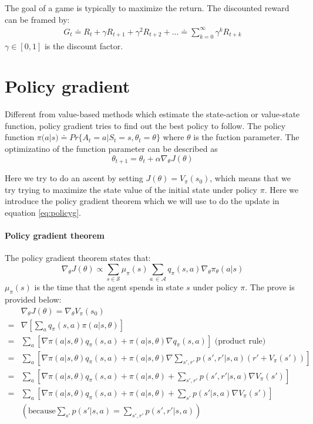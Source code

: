 \documentclass{article}
\begin{document}
\begin{multicols*}{2}
		The goal of a game is typically to maximize the return. The discounted reward can be framed by:
		\begin{align*}
			 G_t \doteq R_{t} + \gamma R_{t+1} + \gamma^{2}R_{t+2} + ... \doteq  \sum_{k=0}^{\infty} \gamma^{k}R_{t+k} 
		\end{align*}
		$ \gamma \in [0, 1] $ is the discount factor.
		
		\section*{Policy gradient}
			 Different from value-based methods which estimate the state-action or value-state function, policy gradient tries to find out the best policy to follow. The policy function $ \pi(a | s) \doteq Pr\{A_t = a | S_t = s, \theta_t = \theta \} $ where $ \theta$ is the fuction parameter. The optimizatino of the function parameter can be described as 
		\begin{equation}\label{eq:policyg}
		\theta_{t+1} = \theta_t + \alpha \nabla_\theta J(\theta) 
		\end{equation}
		
		Here we try to do an ascent by setting $ J(\theta) = V_\pi(s_0) $, which means that we try trying to maximize the state value of the initial state under policy $ \pi $. Here we introduce the policy gradient theorem which we will use to do the update in equation \ref{eq:policyg}.
		\paragraph{\ding{56} Policy gradient theorem}
		The policy gradient theorem states that:
		$$ \nabla_\theta J(\theta) \propto \sum_{s \in \mathcal{S}} \mu_\pi (s) \sum_{a \ \in \mathcal{A}} q_\pi (s,a) \nabla_\theta \pi_\theta(a | s) $$
		$ \mu_\pi (s) $ is the time that the agent spends in state $ s $ under policy $ \pi$. The prove is provided below:
		\begin{align*}
		{}& \nabla_\theta J(\theta)  = \nabla_\theta V_\pi (s_0)   \\
		={}& \nabla [ \sum_a q_\pi(s, a) \pi(a | s, \theta) ] \\
		={}& \sum_ a [ \nabla \pi(a | s, \theta) q_\pi(s, a) +  \pi(a | s, \theta)  \nabla  q_\pi(s, a)] \text{ (product rule)} \\
		={}& \sum_ a [ \nabla \pi(a | s, \theta) q_\pi(s, a) + \pi(a | s, \theta) 
		\nabla  \sum_{s', r'} p(s', r' | s, a) (r' + V_\pi(s')) ]  \\
		={}& \sum_ a [ \nabla \pi(a | s, \theta) q_\pi(s, a) + \pi(a | s, \theta)  
		+  \sum_{s', r'} p(s', r' | s, a)  \nabla  V_\pi(s') ] \\
		={}& \sum_ a [ \nabla \pi(a | s, \theta) q_\pi(s, a) + \pi(a | s, \theta)  
		 +  \sum_{s'} p(s' | s, a) \nabla  V_\pi(s') ] \\
		{}&( \text{because} \sum_{s'} p(s' | s, a) = \sum_{s', r'} p(s', r' | s, a) ) 
		\end{align*} 
		

\end{multicols*}
\end{document}
